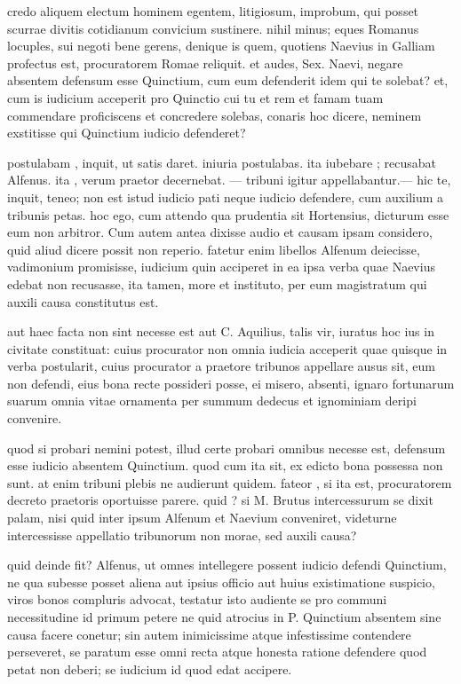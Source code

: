  credo aliquem electum hominem egentem, litigiosum, improbum, qui posset scurrae divitis cotidianum convicium sustinere. nihil minus; eques Romanus locuples, sui negoti bene gerens, denique is quem, quotiens Naevius in Galliam profectus est, procuratorem Romae reliquit. et audes, Sex. Naevi, negare absentem defensum esse Quinctium, cum eum defenderit idem qui te solebat? et, cum is iudicium acceperit pro Quinctio cui tu et rem et famam tuam commendare proficiscens et concredere solebas, conaris hoc dicere, neminem exstitisse qui Quinctium iudicio defenderet?

 postulabam , inquit, ut satis daret. iniuria postulabas. ita iubebare ; recusabat Alfenus. ita , verum praetor decernebat. — tribuni igitur appellabantur.— hic te, inquit, teneo; non est istud iudicio pati neque iudicio defendere, cum auxilium a tribunis petas. hoc ego, cum attendo qua prudentia sit Hortensius, dicturum esse eum non arbitror. Cum autem antea dixisse audio et causam ipsam considero, quid aliud dicere possit non reperio. fatetur enim libellos Alfenum deiecisse, vadimonium promisisse, iudicium quin acciperet in ea ipsa verba quae Naevius edebat non recusasse, ita tamen, more et instituto, per eum magistratum qui auxili causa constitutus est.

 aut haec facta non sint necesse est aut C. Aquilius, talis vir, iuratus hoc ius in civitate constituat: cuius procurator non omnia iudicia acceperit quae quisque in verba postularit, cuius procurator a praetore tribunos appellare ausus sit, eum non defendi, eius bona recte possideri posse, ei misero, absenti, ignaro fortunarum suarum omnia vitae ornamenta per summum dedecus et ignominiam deripi convenire.

 quod si probari nemini potest, illud certe probari omnibus necesse est, defensum esse iudicio absentem Quinctium. quod cum ita sit, ex edicto bona possessa non sunt. at enim tribuni plebis ne audierunt quidem. fateor , si ita est, procuratorem decreto praetoris oportuisse parere. quid ? si M. Brutus intercessurum se dixit palam, nisi quid inter ipsum Alfenum et Naevium conveniret, videturne intercessisse appellatio tribunorum non morae, sed auxili causa?

 quid deinde fit? Alfenus, ut omnes intellegere possent iudicio defendi Quinctium, ne qua subesse posset aliena aut ipsius officio aut huius existimatione suspicio, viros bonos compluris advocat, testatur isto audiente se pro communi necessitudine id primum petere ne quid atrocius in P. Quinctium absentem sine causa facere conetur; sin autem inimicissime atque infestissime contendere perseveret, se paratum esse omni recta atque honesta ratione defendere quod petat non deberi; se iudicium id quod edat accipere.


